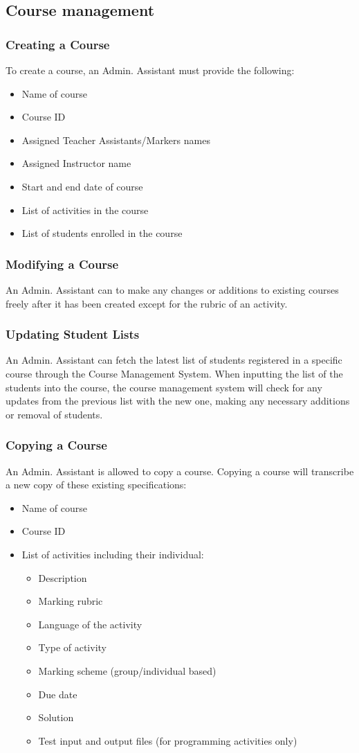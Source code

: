 \documentclass{article}
\begin{document}
\subsection {Course management}
\subsubsection{Creating a Course \label{courseCreation}}
To create a course, an Admin. Assistant must provide the following:
\begin{itemize}
	\item Name of course
	\item Course ID
	\item Assigned Teacher Assistants/Markers names
	\item Assigned Instructor name
	\item Start and end date of course
	\item List of activities in the course
	\item List of students enrolled in the course
\end{itemize}
\subsubsection{Modifying a Course\label{modifying}}
An Admin. Assistant can to make any changes or additions to existing courses
freely after it has been created except for the rubric of an activity.
\subsubsection{Updating Student Lists}
An Admin. Assistant can fetch the latest list of students registered in a
specific course through the Course Management System.
When inputting the list of the students into the course, the course management
system will check for any updates from the previous list with the new one,
making any necessary additions or removal of students.
\subsubsection{Copying a Course}
An Admin. Assistant is allowed to copy a course. Copying a course will transcribe a new copy of these existing specifications:
\begin{itemize}
  \item Name of course
  \item Course ID
  \item List of activities including their individual:
    \begin{itemize}
    \item Description
    \item Marking rubric
    \item Language of the activity
    \item Type of activity
    \item Marking scheme (group/individual based)
    \item Due date
    \item Solution
    \item Test input and output files (for programming activities only)
    \end {itemize}
\end {itemize}
\end{document}
